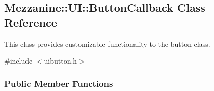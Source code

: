 \hypertarget{classMezzanine_1_1UI_1_1ButtonCallback}{
\subsection{Mezzanine::UI::ButtonCallback Class Reference}
\label{classMezzanine_1_1UI_1_1ButtonCallback}
}


This class provides customizable functionality to the button class.  




{\ttfamily \#include $<$uibutton.h$>$}

\subsubsection*{Public Member Functions}
